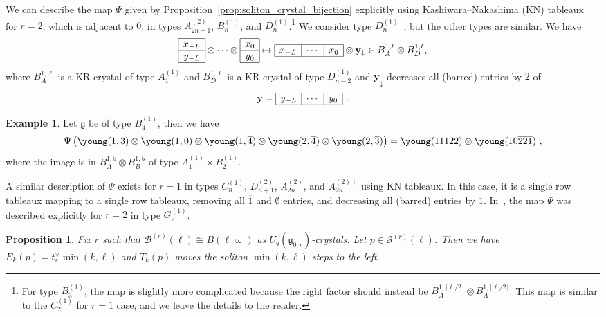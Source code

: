 \documentclass[reqno]{amsart}
\newcommand{\g}{\mathfrak{g}}
\newcommand{\iso}{\cong}
\newcommand{\Sol}{\mathcal{S}} %
\newcommand{\vdomino}[2]{\begin{array}{|c|} \hline #1 \\\hline #2 \\\hline \end{array}} %
\newcommand{\bon}{\overline{1}}
\newcommand{\btw}{\overline{2}}
\newcommand{\bth}{\overline{3}}
\newcommand{\bfo}{\overline{4}}
\theoremstyle{plain}
\newtheorem{prop}[thm]{Proposition}
\theoremstyle{definition}
\newtheorem{ex}[thm]{Example}
\numberwithin{equation}{section}
\begin{document}
We can describe the map $\Psi$ given by Proposition~\ref{prop:soliton_crystal_bijection} explicitly using Kashiwara--Nakashima (KN) tableaux~\cite{FOS09, KN94} for $r = 2$, which is adjacent to $0$, in types $A_{2n-1}^{(2)}$, $B_n^{(1)}$, and $D_n^{(1)}$.\footnote{For type $B_3^{(1)}$, the map is slightly more complicated because the right factor should instead be $B_A^{1,\lfloor \ell/2 \rfloor} \otimes B_A^{1,\lceil \ell/2 \rceil}$. This map is similar to the $C_2^{(1)}$ for $r = 1$ case, and we leave the details to the reader.}
We consider type $D_n^{(1)}$~\cite{MW13}, but the other types are similar.
We have
\[
\vdomino{x_{-L}}{y_{-L}} \otimes \cdots \otimes \vdomino{x_0}{y_0} \mapsto
\begin{array}{|c|c|c|} \hline x_{-L} & \cdots & x_0 \\\hline \end{array} \otimes \mathbf{y}_{\downarrow} \in B_A^{1,\ell} \otimes B_D^{1,\ell},
\]
where $B_A^{1,\ell}$ is a KR crystal of type $A_1^{(1)}$ and $B_D^{1,\ell}$ is a KR crystal of type $D_{n-2}^{(1)}$ and $\mathbf{y}_{\downarrow}$ decreases all (barred) entries by $2$ of
\[
\mathbf{y} = \begin{array}{|c|c|c|} \hline y_{-L} & \cdots & y_0 \\\hline \end{array}\ .
\]

\begin{ex}
\label{ex:decoupling_r=2}
Let $\g$ be of type $B_4^{(1)}$, then we have
\[
\Psi\left( \young(1,3) \otimes \young(1,0) \otimes \young(1,\bfo) \otimes \young(2,\bfo) \otimes \young(2,\bth) \right)
= \young(11122) \otimes \young(10\btw\btw\bon)\ ,
\]
where the image is in $B^{1,5}_A \otimes B^{1,5}_B$ of type $A_1^{(1)} \times B_2^{(1)}$.
\end{ex}

A similar description of $\Psi$ exists for $r = 1$ in types $C_n^{(1)}$, $D_{n+1}^{(2)}$, $A_{2n}^{(2)}$, and $A_{2n}^{(2)\dagger}$ using KN tableaux.
In this case, it is a single row tableaux mapping to a single row tableaux, removing all $\bon$ and $\emptyset$ entries, and decreasing all (barred) entries by $1$.
In~\cite[Prop.~8]{MOW12}, the map $\Psi$ was described explicitly for $r = 2$ in type $G_2^{(1)}$.

\begin{prop}
\label{prop:conserved_quantities}
Fix $r$ such that $\mathcal{B}^{(r)}(\ell) \iso B(\ell \varpi)$ as $U_q(\g_{0,r})$-crystals.
Let $p \in \Sol^{(r)}(\ell)$.
Then we have $E_k(p) = t_r^{\vee} \min(k, \ell)$ and $T_k(p)$ moves the soliton $\min(k, \ell)$ steps to the left.
\end{prop}
\end{document}
